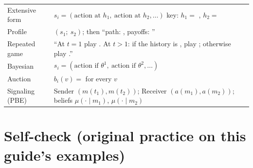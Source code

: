 \documentclass[11pt,a4paper]{article}
\begin{document}
\begin{tmpl}
\begin{tabular}{@{}p{3.6cm}p{11.2cm}@{}}
Extensive form & $s_i=(\text{action at }h_1,\ \text{action at }h_2,\dots)$ \quad key: $h_1=$ \underline{\hspace{1.5cm}}, $h_2=$ \underline{\hspace{1.5cm}}\\[2pt]
Profile & $(s_1;\ s_2)$; then ``path: \underline{\hspace{1.5cm}}, payoffs: \underline{\hspace{1.5cm}}''\\[2pt]
Repeated game & ``At $t=1$ play \underline{\hspace{1cm}}. At $t>1$: if the history is \underline{\hspace{2cm}}, play \underline{\hspace{1cm}}; otherwise play \underline{\hspace{1cm}}.''\\[2pt]
Bayesian & $s_i=(\text{action if }\theta^1,\ \text{action if }\theta^2,\dots)$\\[2pt]
Auction & $b_i(v)=$ \underline{\hspace{1.5cm}} for every $v$\\[2pt]
Signaling (PBE) & Sender $(m(t_1),m(t_2))$; Receiver $(a(m_1),a(m_2))$; beliefs $\mu(\cdot\mid m_1)$, $\mu(\cdot\mid m_2)$
\end{tabular}
\end{tmpl}

\section{Self-check (original practice on this guide's examples)}
\end{document}
